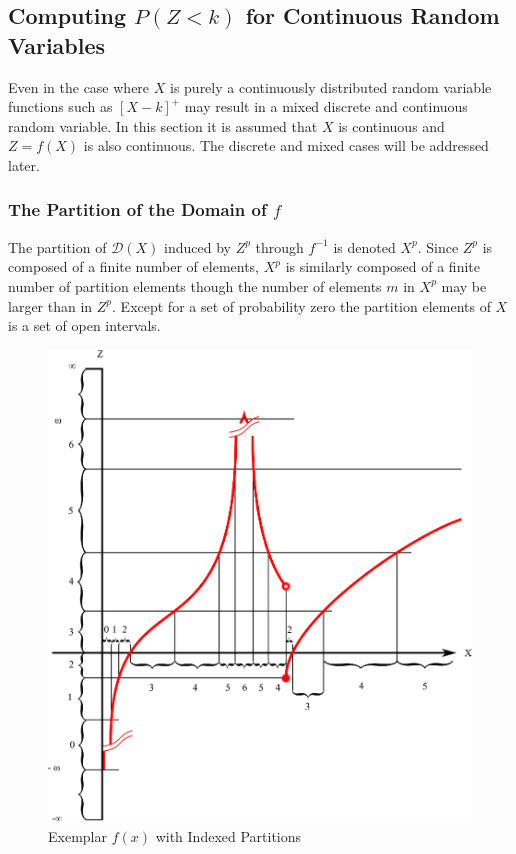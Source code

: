 \subsection{Computing $P(Z < k)$ for Continuous Random Variables}

Even in the case where $X$ is purely a continuously distributed random variable functions such as $[X-k]^+$ may result in a mixed discrete and continuous random variable. In this section it is assumed that $X$ is continuous and $Z = f(X)$ is also continuous. The discrete and mixed cases will be addressed later.


\subsubsection{The Partition of the Domain of $f$}

The partition of $\mathcal{D}(X)$ induced by $Z^p$ through $f^{-1}$ is denoted $X^p$. Since $Z^p$ is composed of a finite number of elements, $X^p$ is similarly composed of a finite number of partition elements though the number of elements $m$ in $X^p$ may be larger than in $Z^p$. Except for a set of probability zero the partition elements of $X$ is a set of open intervals. 
\begin{figure}
  \centering
  \includegraphics{Images/Exemplar_f.eps}
  \caption[Exemplar $f(x)$ with Indexed Partitions]
          {Exemplar $f(x)$ with Indexed Partitions}
  \label{fig:Exemplar_f}
\end{figure}

